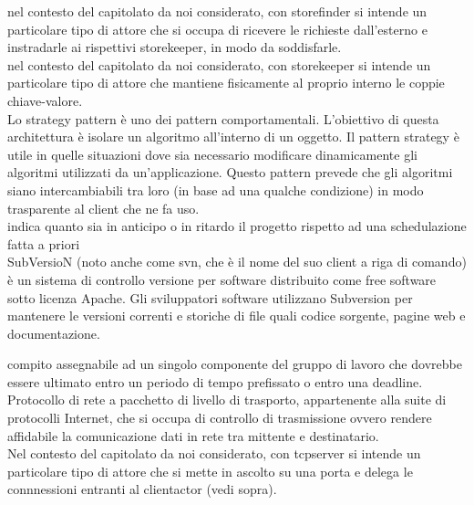 \documentclass{scalatekids-article}
\begin{document}
 nel contesto del capitolato da noi considerato, con storefinder si intende un particolare tipo di attore che si occupa di ricevere le richieste dall’esterno e instradarle ai rispettivi storekeeper, in modo da soddisfarle.
\\

   nel contesto del capitolato da noi considerato, con storekeeper si intende un particolare tipo di attore che mantiene fisicamente al proprio interno le coppie chiave-valore.
  \\
  
   Lo strategy pattern è uno dei pattern comportamentali. L'obiettivo di questa architettura è isolare un algoritmo all'interno di un oggetto. Il pattern strategy è utile in quelle situazioni dove sia necessario modificare dinamicamente gli algoritmi utilizzati da un'applicazione. Questo pattern prevede che gli algoritmi siano intercambiabili tra loro (in base ad una qualche condizione) in modo trasparente al client che ne fa uso.
  \\
  
   indica quanto sia in anticipo o in ritardo il progetto rispetto ad una schedulazione fatta a priori
  \\

   SubVersioN (noto anche come svn, che è il nome del suo client a riga di comando) è un sistema di controllo versione per software distribuito come free software sotto licenza Apache.
  Gli sviluppatori software utilizzano Subversion per mantenere le versioni correnti e storiche di file quali codice sorgente, pagine web e documentazione.
  \\


   compito assegnabile ad un singolo componente del gruppo di lavoro che dovrebbe essere ultimato entro un periodo di tempo prefissato o entro una deadline.
  \\

   Protocollo di rete a pacchetto di livello di trasporto, appartenente alla suite di protocolli Internet, che si occupa di controllo di trasmissione ovvero rendere affidabile la comunicazione dati in rete tra mittente e destinatario. 
  \\

   Nel contesto del capitolato da noi considerato, con tcpserver si intende un particolare tipo di attore che si mette in ascolto su una porta e delega le connnessioni entranti al clientactor (vedi sopra).
  \\
\end{document}
